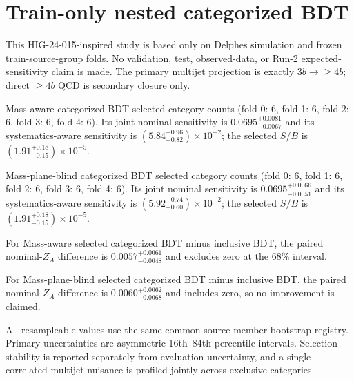 \section{Train-only nested categorized BDT}
This HIG-24-015-inspired study is based only on Delphes simulation and frozen train-source-group folds. No validation, test, observed-data, or Run-2 expected-sensitivity claim is made. The primary multijet projection is exactly $3b\rightarrow{\geq4b}$; direct $\geq4b$ QCD is secondary closure only.

Mass-aware categorized BDT selected category counts (fold 0: 6, fold 1: 6, fold 2: 6, fold 3: 6, fold 4: 6). Its joint nominal sensitivity is $0.0695^{+0.0081}_{-0.0067}$ and its systematics-aware sensitivity is $(5.84^{+0.96}_{-0.82})\times10^{-2}$; the selected $S/B$ is $(1.91^{+0.18}_{-0.15})\times10^{-5}$.

Mass-plane-blind categorized BDT selected category counts (fold 0: 6, fold 1: 6, fold 2: 6, fold 3: 6, fold 4: 6). Its joint nominal sensitivity is $0.0695^{+0.0066}_{-0.0051}$ and its systematics-aware sensitivity is $(5.92^{+0.74}_{-0.60})\times10^{-2}$; the selected $S/B$ is $(1.91^{+0.18}_{-0.15})\times10^{-5}$.

For Mass-aware selected categorized BDT minus inclusive BDT, the paired nominal-$Z_A$ difference is $0.0057^{+0.0061}_{-0.0048}$ and excludes zero at the 68\% interval.

For Mass-plane-blind selected categorized BDT minus inclusive BDT, the paired nominal-$Z_A$ difference is $0.0060^{+0.0062}_{-0.0068}$ and includes zero, so no improvement is claimed.

All resampleable values use the same common source-member bootstrap registry. Primary uncertainties are asymmetric 16th--84th percentile intervals. Selection stability is reported separately from evaluation uncertainty, and a single correlated multijet nuisance is profiled jointly across exclusive categories.
